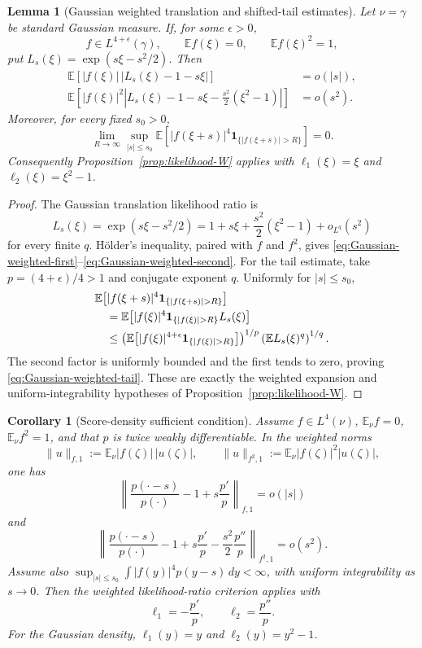 \documentclass[10pt,a4paper]{amsart}
\newtheorem{lemma}[theorem]{Lemma}
\newtheorem{corollary}[theorem]{Corollary}
\newcommand{\E}{\mathbb E}
\newcommand{\one}{\mathbf 1}
\begin{document}
\begin{lemma}[Gaussian weighted translation and shifted-tail estimates]
\label{lem:Gaussian-L4epsilon-W}
Let \(\nu=\gamma\) be standard Gaussian measure.  If, for some \(\epsilon>0\),
\[
        f\in L^{4+\epsilon}(\gamma),
        \qquad \E f(\xi)=0,
        \qquad \E f(\xi)^2=1,
\]
put $L_s(\xi)=\exp(s\xi-s^2/2)$.  Then
\begin{align}
 \E\!\left[|f(\xi)|\,|L_s(\xi)-1-s\xi|\right]
 &=o(|s|),\label{eq:Gaussian-weighted-first}\\
 \E\!\left[|f(\xi)|^2
 \left|L_s(\xi)-1-s\xi-\frac{s^2}{2}(\xi^2-1)\right|\right]
 &=o(s^2).\label{eq:Gaussian-weighted-second}
\end{align}
Moreover, for every fixed $s_0>0$,
\begin{equation}\label{eq:Gaussian-weighted-tail}
 \lim_{R\to\infty}\sup_{|s|\le s_0}
 \E\!\left[|f(\xi+s)|^4
 \one_{\{|f(\xi+s)|>R\}}\right]=0.
\end{equation}
Consequently Proposition~\ref{prop:likelihood-W} applies with
$\ell_1(\xi)=\xi$ and $\ell_2(\xi)=\xi^2-1$.
\end{lemma}

\begin{proof}
The Gaussian translation likelihood ratio is
\[
        L_s(\xi)=\exp(s\xi-s^2/2)
        =1+s\xi+\frac{s^2}{2}(\xi^2-1)+o_{L^q}(s^2)
\]
for every finite $q$.  H\"older's inequality, paired with $f$ and $f^2$,
gives \eqref{eq:Gaussian-weighted-first}--\eqref{eq:Gaussian-weighted-second}.
For the tail estimate, take $p=(4+\epsilon)/4>1$ and conjugate exponent $q$.
Uniformly for $|s|\le s_0$,
\begin{align*}
&\E\bigl[|f(\xi+s)|^4{\bf 1}_{\{|f(\xi+s)|>R\}}\bigr]\\
&\quad=\E\bigl[|f(\xi)|^4{\bf 1}_{\{|f(\xi)|>R\}}L_s(\xi)\bigr]\\
&\quad\le
\left(\E\bigl[|f(\xi)|^{4+\epsilon}{\bf 1}_{\{|f(\xi)|>R\}}\bigr]\right)^{1/p}
\left(\E L_s(\xi)^q\right)^{1/q}.
\end{align*}
The second factor is uniformly bounded and the first
tends to zero, proving \eqref{eq:Gaussian-weighted-tail}.  These are exactly
the weighted expansion and uniform-integrability hypotheses of
Proposition~\ref{prop:likelihood-W}.
\end{proof}

\begin{corollary}[Score-density sufficient condition]
\label{cor:score-W}
Assume \(f\in L^4(\nu)\), \(\E_\nu f=0\),
\(\E_\nu f^2=1\), and that \(p\) is twice weakly differentiable.  In the
weighted norms
\[
        \|u\|_{f,1}:=\E_\nu |f(\zeta)|\,|u(\zeta)|,
        \qquad
        \|u\|_{f^2,1}:=\E_\nu |f(\zeta)|^2|u(\zeta)|,
\]
one has
\[
        \left\|\frac{p(\cdot-s)}{p(\cdot)}-1+s\frac{p'}{p}\right\|_{f,1}=o(|s|)
\]
and
\[
        \left\|\frac{p(\cdot-s)}{p(\cdot)}-1+s\frac{p'}{p}-\frac{s^2}{2}\frac{p''}{p}\right\|_{f^2,1}=o(s^2).
\]
Assume also \(\sup_{|s|\le s_0}\int |f(y)|^4p(y-s)\,dy<\infty\), with uniform integrability as \(s\to0\).  Then the weighted likelihood-ratio criterion applies with
\[
        \ell_1=-\frac{p'}{p},\qquad \ell_2=\frac{p''}{p}.
\]
For the Gaussian density, \(\ell_1(y)=y\) and \(\ell_2(y)=y^2-1\).
\end{corollary}
\end{document}
